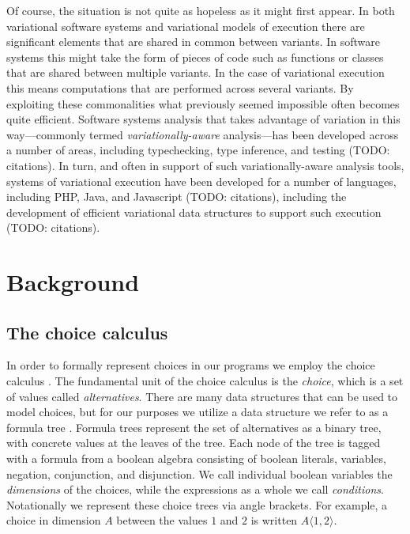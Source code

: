 \documentclass[letterpaper,10pt,onecolumn]{article}
\newcommand{\tagtree}[3]{#1 \langle #2, #3 \rangle}
\begin{document}
Of course, the situation is not quite as hopeless as it might first appear. In both variational software systems and variational models of execution
there are significant elements that are shared in common between variants. In software systems this might take the form of pieces of code such as functions
or classes that are shared between multiple variants. In the case of variational execution this means computations that are performed across several variants.
By exploiting these commonalities what previously seemed impossible often becomes quite efficient. Software systems analysis that takes advantage of variation
in this way---commonly termed \emph{variationally-aware} analysis---has been developed across a number of areas, including typechecking, type inference, and
testing (TODO: citations). In turn, and often in support of such variationally-aware analysis tools, systems of variational execution have been developed for a number
of languages, including PHP, Java, and Javascript (TODO: citations), including the development of efficient variational data structures to support such execution (TODO: citations).



\section{Background}

\subsection{The choice calculus}

In order to formally represent choices in our programs we employ the choice
calculus \cite{ericthesis,erwig2011choice}. The fundamental unit of the choice calculus is
the \emph{choice}, which is a set of values called \emph{alternatives}.
There are many data structures that can be used to model
choices, but for our purposes we utilize a data structure we refer
to as a formula tree \cite{walkingshaw2014projectional,walkingshaw2014variational}.
Formula trees represent the set of alternatives as a binary tree, with concrete
values at the leaves of the tree. Each node of the tree is tagged with a formula from a boolean
algebra consisting of boolean literals, variables, negation, conjunction, and disjunction. We call individual
boolean variables the \emph{dimensions} of the choices, while the expressions as a whole we call \emph{conditions}. Notationally we represent these choice trees
via angle brackets. For example, a choice in dimension $A$
between the values $1$ and $2$ is written $\tagtree{A}{1}{2}$.
\end{document}
